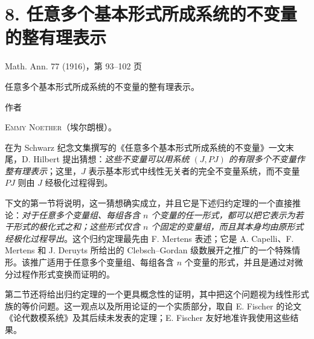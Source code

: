 \section*{8. 任意多个基本形式所成系统的不变量的整有理表示}
\begin{center}
Math. Ann. 77 (1916)，第 93--102 页
\end{center}

\begin{center}
{\Large 任意多个基本形式所成系统的不变量的整有理表示。}\par
\vspace{1.2em}
作者\par
\vspace{0.8em}
{\scshape Emmy Noether}（埃尔朗根）。
\end{center}

在为 Schwarz 纪念文集撰写的《任意多个基本形式所成系统的不变量》一文末尾，D. Hilbert 提出猜想：\emph{这些不变量可以用系统 $(J,PJ)$ 的有限多个不变量作整有理表示}；这里，$J$ 表示基本形式中线性无关者的完全不变量系统，而不变量 $PJ$ 则由 $J$ 经极化过程得到。

下文的第一节将说明，这一猜想确实成立，并且它是下述归约定理的一个直接推论：\emph{对于任意多个变量组、每组各含 $n$ 个变量的任一形式，都可以把它表示为若干形式的极化式之和；这些形式仅含 $n$ 个固定的变量组，而且其本身均由原形式经极化过程导出}。这个归约定理最先由 F. Mertens 表述；它是 A. Capelli、F. Mertens 和 J. Deruyts 所给出的 Clebsch--Gordan 级数展开之推广的一个特殊情形。该推广适用于任意多个变量组、每组各含 $n$ 个变量的形式，并且是通过对微分过程作形式变换而证明的。

第二节还将给出归约定理的一个更具概念性的证明，其中把这个问题视为线性形式族的等价问题。这一观点以及所用论证的一个实质部分，取自 E. Fischer 的论文《论代数模系统》及其后续未发表的定理；E. Fischer 友好地准许我使用这些结果。


